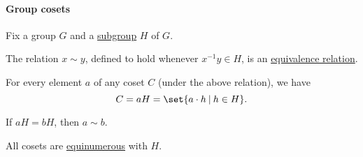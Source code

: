 \paragraph{Group cosets}

\begin{proposition}\label{thm:subgroup_cosets}
  Fix a group \( G \) and a \hyperref[def:group/submodel]{subgroup} \( H \) of \( G \).

  \begin{thmenum}
     The relation \( x \sim y \), defined to hold whenever \( x^{-1} y \in H \), is an \hyperref[def:equivalence_relation]{equivalence relation}.

     For every element \( a \) of any coset \( C \) (under the above relation), we have
    \begin{equation*}
      C = a H = \set{ a \cdot h \given h \in H }.
    \end{equation*}

     If \( a H = b H \), then \( a \sim b \).

     All cosets are \hyperref[def:equinumerosity]{equinumerous} with \( H \).
  \end{thmenum}
\end{proposition}
